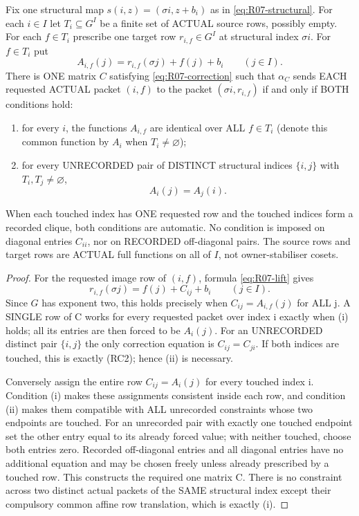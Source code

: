 \begin{lemma}
\label{lem:R07-row-compatibility-iff}
Fix one structural map
$s(i,z)=(\sigma i,z+b_i)$ as in
\eqref{eq:R07-structural}. For each $i\in I$
let $T_i\subseteq G^I$ be a finite
set of ACTUAL source rows, possibly
empty. For each $f\in T_i$ prescribe
one target row $r_{i,f}\in G^I$
at structural index $\sigma i$.
For $f\in T_i$ put
\[
 A_{i,f}(j)=r_{i,f}(\sigma j)+f(j)+b_i
                  \qquad(j\in I).
\tag{RC1}\label{eq:R07-row-compatibility-shift}
\]
There is ONE matrix $C$ satisfying
\eqref{eq:R07-correction} such that
$\alpha_C$ sends EACH requested
ACTUAL packet $(i,f)$ to the
packet $(\sigma i,r_{i,f})$ if
and only if BOTH conditions hold:
\begin{enumerate}[label=(\roman*)]
\item for every $i$, the functions
$A_{i,f}$ are identical over
ALL $f\in T_i$ (denote this
common function by $A_i$ when
$T_i\ne\varnothing$);
\item for every UNRECORDED pair
of DISTINCT structural indices
$\{i,j\}$ with
$T_i,T_j\ne\varnothing$,
\[
                         A_i(j)=A_j(i).
\tag{RC2}\label{eq:R07-row-compatibility-edge}
\]
\end{enumerate}
When each touched index has
ONE requested row and the
touched indices form a
recorded clique, both
conditions are automatic.
No condition is imposed
on diagonal entries $C_{ii}$,
nor on RECORDED off-diagonal
pairs. The source rows and
target rows are ACTUAL full
functions on all of $I$,
not owner-stabiliser cosets.
\end{lemma}
\begin{proof}
For the requested image row
of $(i,f)$, formula
\eqref{eq:R07-lift} gives
\[
 r_{i,f}(\sigma j)
       = f(j)+C_{ij}+b_i
             \qquad(j\in I).
\]
Since $G$ has exponent two,
this holds precisely when
$C_{ij}=A_{i,f}(j)$ for
ALL j. A SINGLE row of C
works for every requested
packet over index i exactly
when (i) holds; all its
entries are then forced to
be $A_i(j)$. For an UNRECORDED
distinct pair $\{i,j\}$ the
only correction equation is
$C_{ij}=C_{ji}$.
If both indices are touched,
this is exactly (RC2);
hence (ii) is necessary.

Conversely assign the entire
row $C_{ij}=A_i(j)$ for
every touched index i.
Condition (i) makes these
assignments consistent inside
each row, and condition (ii)
makes them compatible with
ALL unrecorded constraints
whose two endpoints are
touched. For an unrecorded
pair with exactly one touched
endpoint set the other entry
equal to its already forced
value; with neither touched,
choose both entries zero.
Recorded off-diagonal entries
and all diagonal entries
have no additional equation
and may be chosen freely
unless already prescribed by
a touched row. This constructs
the required one matrix C.
There is no constraint across
two distinct actual packets
of the SAME structural index
except their compulsory
common affine row translation,
which is exactly (i).
\end{proof}

